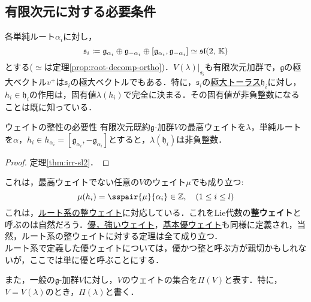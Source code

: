 \documentclass[rep_main]{subfiles}
\begin{document}
\subsection{有限次元に対する必要条件}
各単純ルート$\alpha_i$に対し，
	\begin{equation}
		\mathfrak{s}_i \coloneqq \mathfrak{g}_{\alpha_i} \oplus \mathfrak{g}_{-\alpha_i} \oplus [\mathfrak{g}_{\alpha_i}, \mathfrak{g}_{-\alpha_i}] \simeq \mathfrak{sl}(2,\, \mathbb{K})
	\end{equation}
	とする($\simeq$は定理\ref{prop:root-decomp-ortho})．$V(\lambda)|_{\mathfrak{s}_i}$も有限次元加群で，$\mathfrak{g}$の極大ベクトル$v^+$は$\mathfrak{s}_i$の極大ベクトルでもある．特に，$\mathfrak{s}_i$の\hyperref[def:toral-subLieAlg]{極大トーラス}$\mathfrak{h}_i$に対し，$h_i \in \mathfrak{h}_i$の作用は，固有値$\lambda(h_i)$で完全に決まる．その固有値が非負整数になることは既に知っている．
\begin{mytheo}[label=thm:necessary-for-finite]{ウェイトの整性の必要性}
	有限次元既約$\mathfrak{g}$-加群$V$の最高ウェイトを$\lambda$，単純ルートを$\alpha$，$h_i \in h_{\alpha_i} = [\mathfrak{g}_{\alpha_i}, -\mathfrak{g}_{\alpha_i}]$とすると，$\lambda(\mathfrak{h}_i)$は非負整数．
\end{mytheo}
\begin{proof}
	定理\ref{thm:irr-sl2}．
\end{proof}
これは，最高ウェイトでない任意の$V$のウェイト$\mu$でも成り立つ:
\begin{equation}
	\label{eq:int-weight}
	\mu(h_i) = \sspair{\mu}{\alpha_i} \in \mathbb{Z},\quad  (1 \leq i \leq l)
\end{equation}
これは，\hyperref[def:root-lattice]{ルート系の整ウェイト}に対応している．これをLie代数の\textbf{整ウェイト}と呼ぶのは自然だろう．\hyperref[def:domweight]{優，強いウェイト}，\hyperref[def:fundamental-weight]{基本優ウェイト}も同様に定義され，当然，ルート系の整ウェイトに対する定理は全て成り立つ．\\
ルート系で定義した優ウェイトについては，優かつ整と呼ぶ方が親切かもしれないが，ここでは単に優と呼ぶことにする．

また，一般の$\mathfrak{g}$-加群$V$に対し，$V$のウェイトの集合を$\Pi(V)$と表す．特に，$V = V(\lambda)$のとき，$\Pi(\lambda)$と書く．
\end{document}
